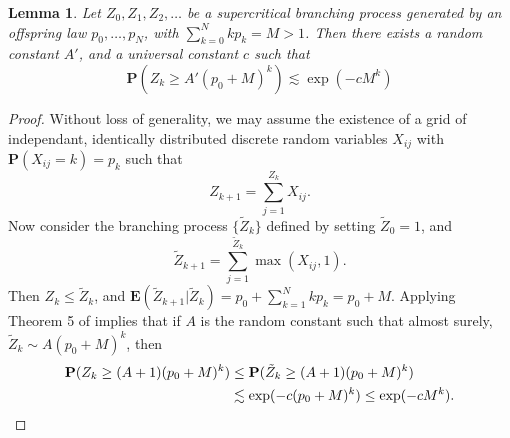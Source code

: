 \documentclass[dvipsnames,letterpaper,12pt]{article}
\theoremstyle{plain}
\newtheorem{lemma}{Lemma}
\begin{document}
\begin{lemma}\label{branchingtrick}
	Let $Z_0, Z_1, Z_2, \dots$ be a supercritical branching process generated by an offspring law $p_0, \dots, p_N$, with $\sum_{k = 0}^N k p_k = M > 1$. Then there exists a random constant $A'$, and a universal constant $c$ such that
	\[ \mathbf{P}(Z_k \geq A' (p_0 + M)^k) \lesssim \exp(-c M^k) \]
\end{lemma}
\begin{proof}
	Without loss of generality, we may assume the existence of a grid of independant, identically distributed discrete random variables $X_{ij}$ with $\mathbf{P}(X_{ij} = k) = p_k$ such that
	\[ Z_{k+1} = \sum_{j = 1}^{Z_k} X_{ij}. \]
	Now consider the branching process $\{ \tilde{Z}_k \}$ defined by setting $\tilde{Z}_0 = 1$, and
	\[ \tilde{Z}_{k+1} = \sum_{j = 1}^{\tilde{Z}_k} \max(X_{ij}, 1). \]
	Then $Z_k \leq \tilde{Z}_k$, and $\mathbf{E}(\tilde{Z}_{k+1}|\tilde{Z}_k) = p_0 + \sum_{k = 1}^N k p_k = p_0 + M$. Applying Theorem 5 of \cite{Athreya} implies that if $A$ is the random constant such that almost surely, $\tilde{Z}_k \sim A (p_0 + M)^k$, then
	\begin{align*}
		\mathbf{P}(Z_k \geq (A+1) (p_0 + M)^k) &\leq \mathbf{P}(\tilde{Z}_k \geq (A+1) (p_0 + M)^k)\\
		&\lesssim \exp(-c (p_0 + M)^k ) \leq \exp(-c M^k). \qedhere
	\end{align*}
\end{proof}
\end{document}
